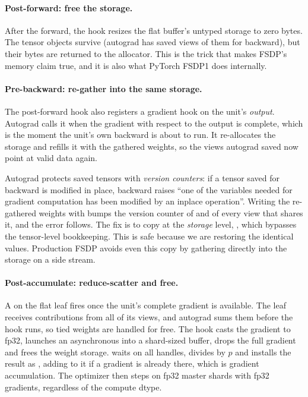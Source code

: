 \paragraph{Post-forward: free the storage.} After the forward, the hook resizes the
flat buffer's untyped storage to zero bytes. The tensor objects survive (autograd has saved views
of them for backward), but their bytes are returned to the allocator. This is the trick that
makes FSDP's memory claim true, and it is also what PyTorch FSDP1 does internally.

\paragraph{Pre-backward: re-gather into the same storage.} The post-forward hook also registers a
gradient hook on the unit's \emph{output}. Autograd calls it when the gradient with respect to the
output is complete, which is the moment the unit's own backward is about to run. It re-allocates
the storage and refills it with the gathered weights, so the views autograd saved now point at
valid data again.

\begin{pitfall}
Autograd protects saved tensors with \emph{version counters}: if a tensor saved for backward is
modified in place, backward raises ``one of the variables needed for gradient computation has been
modified by an inplace operation''. Writing the re-gathered weights with
 bumps the version counter of  and of every view that shares it,
and the error follows. The fix is to copy at the \emph{storage} level,
, which bypasses the tensor-level
bookkeeping. This is safe because we are restoring the identical values. Production FSDP avoids
even this copy by gathering directly into the storage on a side stream.
\end{pitfall}

\paragraph{Post-accumulate: reduce-scatter and free.} A
 on the flat leaf fires once the unit's complete
gradient is available. The leaf receives contributions from all of its views, and autograd sums
them before the hook runs, so tied weights are handled for free. The hook casts the gradient to
fp32, launches an asynchronous  into a shard-sized buffer, drops the
full gradient and frees the weight storage.  waits on all
handles, divides by $p$ and installs the result as , adding to it if a gradient is
already there, which is gradient accumulation. The optimizer then steps on fp32 master shards with
fp32 gradients, regardless of the compute dtype.

